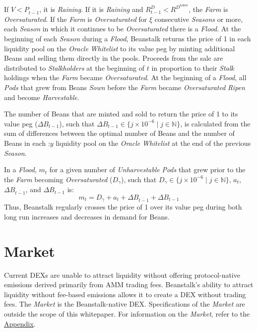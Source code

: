 \documentclass[tikz]{article}
\newcommand{\term}[1]{\textsl{#1}}
\newcommand{\Bean}{} %
\begin{document}
If $V < P_{\overline{t-1}}$, it is \term{Raining}. If it is \term{Raining} and $R^D_{t-1} < R^{D^{\text{lower}}}$, the \term{Farm} is \term{Oversaturated}. If the \term{Farm} is \term{Oversaturated} for $\xi$ consecutive \term{Seasons} or more, each \term{Season} in which it continues to be \term{Oversaturated} there is a \term{Flood}. At the beginning of each \term{Season} during a \term{Flood}, Beanstalk returns the price of \Bean1 in each liquidity pool on the \term{Oracle} \term{Whitelist} to its value peg by minting additional Beans and selling them directly in the pools. Proceeds from the sale are distributed to \term{Stalkholders} at the beginning of $t$ in proportion to their \term{Stalk} holdings when the \term{Farm} became \term{Oversaturated}. At the beginning of a \term{Flood}, all \term{Pods} that grew from Beans \term{Sown} before the \term{Farm} became \term{Oversaturated} \term{Ripen} and become \term{Harvestable}.

The number of Beans that are minted and sold to return the price of \Bean1 to its value peg ($\Delta B_{t-1}$), such that $\Delta B_{t-1} \in \{j \times 10^{-6} \mid j \in \mathbb{N} \}$, is calculated from the sum of differences between the optimal number of Beans and the number of Beans in each \Bean:$y$ liquidity pool on the \term{Oracle} \term{Whitelist} at the end of the previous \term{Season}.

\newpage
In a \term{Flood}, $m_t$ for a given number of \term{Unharvestable} \term{Pods} that grew prior to the the \term{Farm} becoming \term{Oversaturated} ($D_{\gamma}$), such that $D_{\gamma} \in \{j \times 10^{-6} \mid j \in \mathbb{N} \}$, $a_t$, $\Delta B_{\overline{t-1}}$, and $\Delta B_{t-1}$ is:
$$m_t = D_{\gamma} + a_t + \Delta B_{\overline{t-1}} + \Delta B_{t-1}$$
Thus, Beanstalk regularly crosses the price of \Bean1 over its value peg during both long run increases and decreases in demand for Beans.

\section{Market}
Current DEXs are unable to attract liquidity without offering protocol-native emissions derived primarily from AMM trading fees. Beanstalk's ability to attract liquidity without fee-based emissions allows it to create a DEX without trading fees. The \term{Market} is the Beanstalk-native DEX. Specifications of the \term{Market} are outside the scope of this whitepaper. For information on the \term{Market}, refer to the \hyperlink{section.14}{Appendix}.
\end{document}
